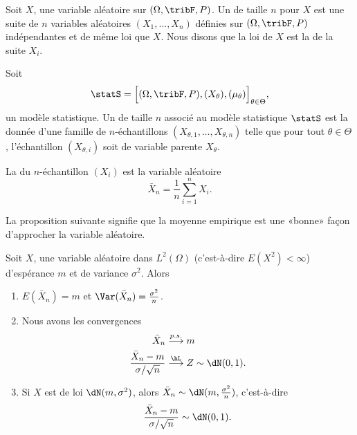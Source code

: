 Soit \( X\), une variable aléatoire sur \( (\Omega,\tribF,P)\). Un  de taille \( n\) pour \( X\) est une suite de \( n\) variables aléatoires \( (X_1,\ldots,X_n)\) définies sur \( (\Omega,\tribF,P)\) indépendantes et de même loi que \( X\). Nous disons que la loi de \( X\) est la  de la suite \( X_i\).

\begin{definition}
	Soit
	\begin{equation}
		\statS=\Big[ (\Omega,\tribF,P),(X_{\theta}),(\mu_{\theta}) \Big]_{\theta\in\Theta},
	\end{equation}
	un modèle statistique. Un  de taille \( n\) associé au modèle statistique \( \statS\) est la donnée d'une famille de \( n\)-échantillons \( (X_{\theta,1},\ldots,X_{\theta,n})\) telle que pour tout \( \theta\in\Theta\), l'échantillon \( (X_{\theta,i})\) soit de variable parente \( X_{\theta}\).
\end{definition}

La  du \( n\)-échantillon \( (X_i)\) est la variable aléatoire
\begin{equation}
	\bar X_n=\frac{1}{ n }\sum_{i=1}^{n}X_i.
\end{equation}

La proposition suivante signifie que la moyenne empirique est une «bonne» façon d'approcher la variable aléatoire.
\begin{proposition}
	Soit \( X\), une variable aléatoire dans \( L^2(\Omega)\) (c'est-à-dire \( E(X^2)<\infty\)) d'espérance \( m\) et de variance \( \sigma^2\). Alors
	\begin{enumerate}
		\item
		      \( E(\bar X_n)=m\) et \( \Var(\bar X_n)=\frac{ \sigma^2 }{ n }\).
		\item
		      Nous avons les convergences
		      \begin{subequations}
			      \begin{align}
				      \bar X_n                               & \stackrel{p.s.}{\longrightarrow} m             \\
				      \frac{ \bar X_n-m }{ \sigma/\sqrt{n} } & \stackrel{\hL}{\longrightarrow} Z\sim\dN(0,1).
			      \end{align}
		      \end{subequations}
		\item
		      Si \( X\) est de loi \( \dN(m,\sigma^2)\), alors \( \bar X_n\sim\dN(m,\frac{ \sigma^2 }{ n })\), c'est-à-dire
		      \begin{equation}
			      \frac{ \bar X_n -m}{ \sigma/\sqrt{n} }\sim\dN(0,1).
		      \end{equation}


	\end{enumerate}

\end{proposition}


